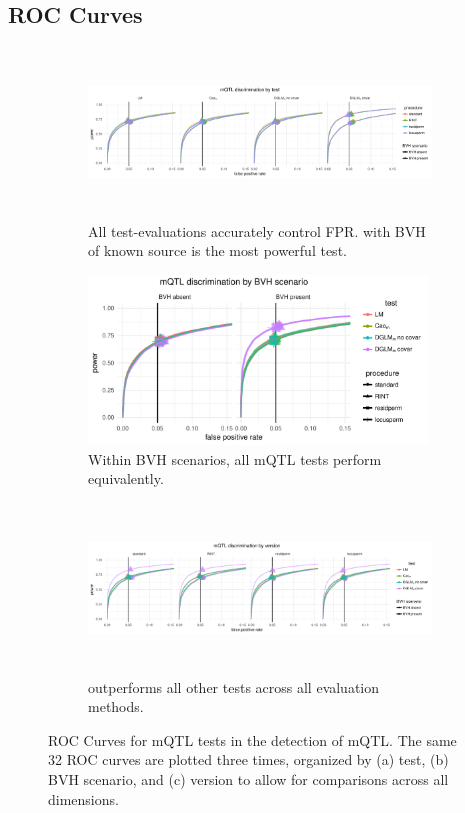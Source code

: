 \subsection{ROC Curves}
  \begin{figure}[!ht]
      \begin{subfigure}{\textwidth}
          \centering
          \includegraphics[height = 4.5cm]{images/rocs_mqtl_all_facet_by_test.pdf}
          \caption{
          All test-evaluations accurately control FPR. \DGLMm with BVH of known source is the most powerful test.}
      \vspace*{1cm}
      \end{subfigure}
      \begin{subfigure}{\textwidth}
          \centering
          \includegraphics[height = 4.5cm]{images/rocs_mqtl_all_facet_by_bvh.pdf}
          \caption{
          Within BVH scenarios, all mQTL tests perform equivalently.}
      \vspace*{1cm}
      \end{subfigure}
      \begin{subfigure}{\textwidth}
          \centering
          \includegraphics[height = 4.5cm]{images/rocs_mqtl_all_facet_by_eval.pdf}
          \caption{
          \DGLMm outperforms all other tests across all evaluation methods.}
      \end{subfigure}
      \caption[
        ROC Curves for mQTL tests in the detection of mQTL.
      ]
      {
        ROC Curves for mQTL tests in the detection of mQTL.
        The same 32 ROC curves are plotted three times, organized by (a) test, (b) BVH scenario, and (c) version to allow for comparisons across all dimensions.
      }
      \label{fig:mqtl_rocs_supp}
  \end{figure}


